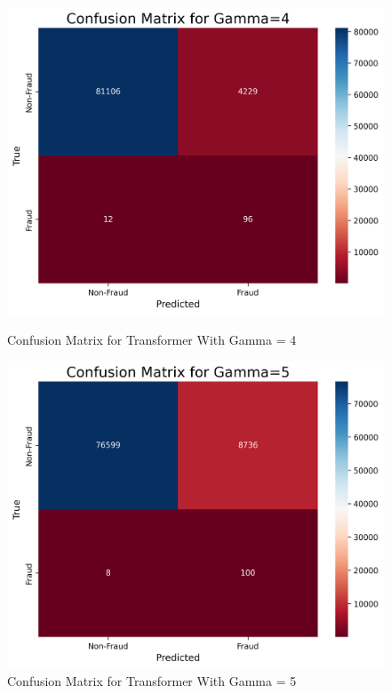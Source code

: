 \documentclass[11pt, oneside]{article}   	%
\begin{document}
\begin{figure}[H]
    \centering
    \begin{minipage}{0.49\textwidth}
        \centering
        \includegraphics[width=1.0\textwidth]{images/confusion_matrix_transformer_4.png}
        \caption{Confusion Matrix for Transformer With Gamma = 4}
        \label{fig:confusion_matrix_transformer_4}
    \end{minipage}\hfill
    \begin{minipage}{0.49\textwidth}
        \centering
        \includegraphics[width=1.0\textwidth]{images/confusion_matrix_transformer_5.png}
        \caption{Confusion Matrix for Transformer With Gamma = 5}
        \label{fig:confusion_matrix_transformer_5}
    \end{minipage}
\end{figure}
\end{document}
